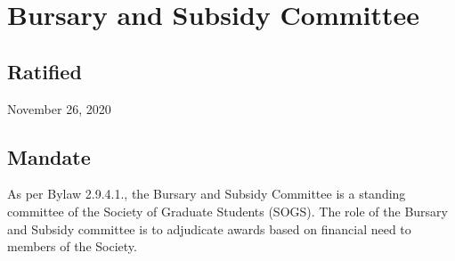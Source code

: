 \section{Bursary and Subsidy Committee}

\subsection{Ratified}
November 26, 2020

\subsection{Mandate}
As per Bylaw 2.9.4.1., the Bursary and Subsidy Committee is a standing committee of the Society of Graduate Students (SOGS). The role of the Bursary and Subsidy committee is to adjudicate awards based on financial need to members of the Society.

